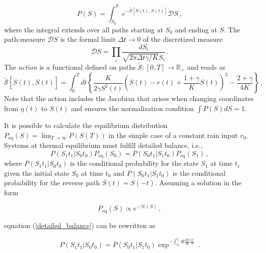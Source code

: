 \documentclass[11pt, a4paper]{article}
\begin{document}
\begin{equation}\label{pathint}
P(S) = \int_{S_0}^{S} e^{-\tilde{\mathcal S}[\dot{S}(t),S(t)]} \mathcal{D}S \,,
\end{equation}
where the integral extends over all paths starting at $S_0$ and ending at $S$.
The path-measure $\mathcal DS$ is the formal limit $\Delta t\rightarrow 0$ of the discretized measure
\begin{equation}\label{pathmeasure}
{\mathcal D}S
=
\prod_{i}
\frac{dS_i}{\sqrt{2\pi \mathit{\Delta t} \gamma/K }S_i}\,.
\end{equation}
The {\em action} is a functional defined on paths $\tilde{\mathcal S}:[0,T]\longrightarrow \mathbb R_+$ and reads as
\begin{equation}\label{action}
  \tilde{\mathcal S}[\dot{S}(t),S(t)]
  =
  \int_0^T
  dt
  \left\{
    \frac{K}{2\gamma S^2(t)}
    \left(
        \dot S(t)
        -
        r(t)
        +
        \frac{1+\gamma}{K}S(t)
    \right)^2
    -
    \frac{2+\gamma}{4K}
  \right\}
 \,.
\end{equation}
Note that the action includes the Jacobian that arises when changing coordinates from ${\eta(t)}$ to $S(t)$ and ensures the normalization condition $\int{ P(S) \mathit{dS}}=1$.

It is possible to calculate the equilibrium distribution $P_{\text{eq}}(S) = \lim_{T\rightarrow\infty} P(S(T))$ in the simple case of a constant rain input $r_{0}$. Systems at thermal equilibrium must fulfill detailed balance, i.e.,
\begin{equation}\label{detailed_balance}
P(S_1 t_1 | S_0 t_0 ) P_{\text{eq}}(S_0) = P(S_0 t_1 | S_1 t_0 ) P_{\text{eq}}(S_1) \,,
\end{equation}
where $P(S_1 t_1 | S_0 t_0 )$ is the conditional probability for the state $S_1$ at time $t_1$ given the initial state $S_0$ at time $t_0$ and $P(S_0 t_1 | S_1 t_0 )$ is the conditional probability for the reverse path $\overline{S}(t) = S(-t)$. Assuming a solution in the form

\begin{equation}\label{Peq}
  P_{\text{eq}}(S)
  \propto
  e^{-\mathcal{H}(S)}\,,
\end{equation}

equation (\ref{detailed_balance}) can be rewritten as

\begin{equation}\label{detailed_balance_2}
P(S_1 t_1 | S_0 t_0 ) = P(S_0 t_1 | S_1 t_0 ) \exp^{-\int_{t_0}^{t_1} dt \frac{dS}{dt}\frac{\mathcal{H}}{S}}\,.
\end{equation}
\end{document}
